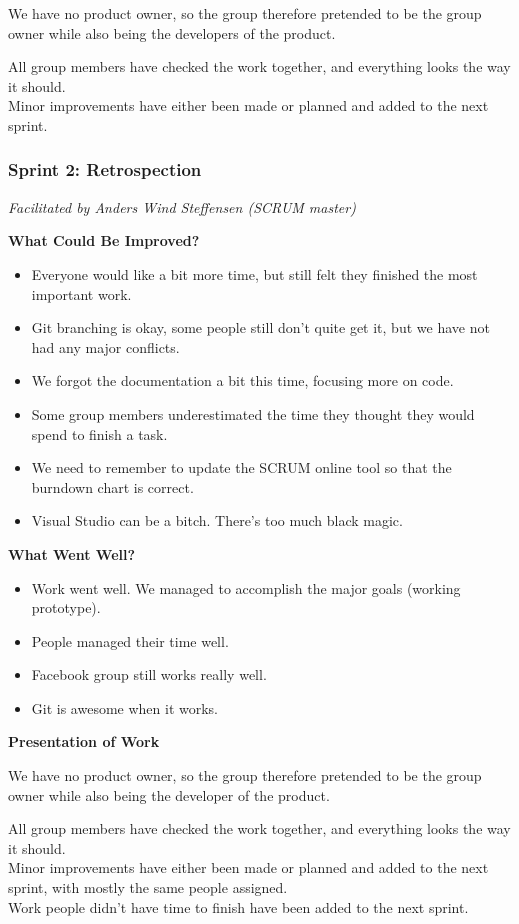 We have no product owner, so the group therefore pretended to be the group owner while also being the developers of the product. 

All group members have checked the work together, and everything looks the way it should. \\
Minor improvements have either been made or planned and added to the next sprint. 


\subsubsection{Sprint 2: Retrospection}
\label{sec:sprint2}
\small{\textit{Facilitated by Anders Wind Steffensen (SCRUM master)}} 

\textbf{What Could Be Improved?}

\begin{itemize}
	\item Everyone would like a bit more time, but still felt they finished the most important work.
	\item Git branching is okay, some people still don't quite get it, but we have not had any major conflicts.
	\item We forgot the documentation a bit this time, focusing more on code. 
	\item Some group members underestimated the time they thought they would spend to finish a task.
	\item We need to remember to update the SCRUM online tool so that the burndown chart is correct.
	\item Visual Studio can be a bitch. There's too much black magic.
\end{itemize}

\textbf{What Went Well?}

\begin{itemize}
	\item Work went well. We managed to accomplish the major goals (working prototype).
	\item People managed their time well.
	\item Facebook group still works really well.
	\item Git is awesome when it works.
\end{itemize}

\textbf{Presentation of Work}

We have no product owner, so the group therefore pretended to be the group owner while also being the developer of the product.

All group members have checked the work together, and everything looks the way it should.\\
Minor improvements have either been made or planned and added to the next sprint, with mostly the same people assigned.\\
Work people didn't have time to finish have been added to the next sprint.

